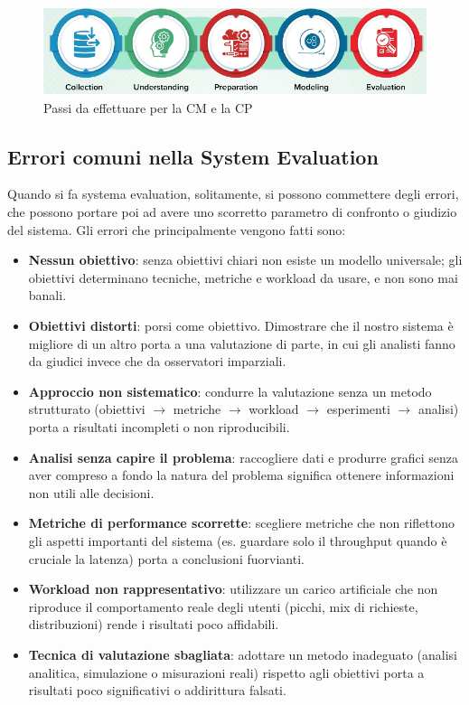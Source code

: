 \begin{figure}
    \includegraphics[width=.8\textwidth]{img/chapter-1/passi_CMCP.png}
    \centering
    \caption{Passi da effettuare per la CM e la CP}\label{img:passi}
\end{figure}

\subsection{Errori comuni nella System Evaluation}
Quando si fa systema evaluation, solitamente, si possono commettere degli errori, che possono portare poi ad avere uno scorretto parametro di confronto o giudizio del sistema. Gli errori che principalmente vengono fatti sono:
\begin{itemize}
  \item \textbf{Nessun obiettivo}: senza obiettivi chiari non esiste un modello universale; 
  gli obiettivi determinano tecniche, metriche e workload da usare, e non sono mai banali.
  
  \item \textbf{Obiettivi distorti}: porsi come obiettivo. Dimostrare che il nostro sistema è 
  migliore di un altro porta a una valutazione di parte, in cui gli analisti fanno da giudici invece che da osservatori imparziali.
  
  \item \textbf{Approccio non sistematico}: condurre la valutazione senza un metodo strutturato 
  (obiettivi $\rightarrow$ metriche $\rightarrow$ workload $\rightarrow$ esperimenti $\rightarrow$ analisi) 
  porta a risultati incompleti o non riproducibili.
  
  \item \textbf{Analisi senza capire il problema}: raccogliere dati e produrre grafici senza 
  aver compreso a fondo la natura del problema significa ottenere informazioni non utili alle decisioni.
  
  \item \textbf{Metriche di performance scorrette}: scegliere metriche che non riflettono gli 
  aspetti importanti del sistema (es. guardare solo il throughput quando è cruciale la latenza) porta a conclusioni fuorvianti.
  
  \item \textbf{Workload non rappresentativo}: utilizzare un carico artificiale che non riproduce 
  il comportamento reale degli utenti (picchi, mix di richieste, distribuzioni) rende i risultati poco affidabili.
  
  \item \textbf{Tecnica di valutazione sbagliata}: adottare un metodo inadeguato (analisi analitica, simulazione o misurazioni reali) 
  rispetto agli obiettivi porta a risultati poco significativi o addirittura falsati.
\end{itemize}

